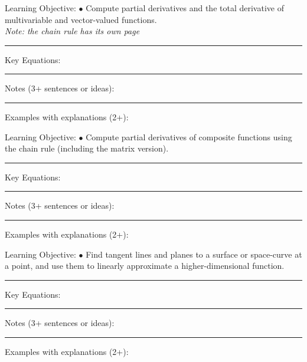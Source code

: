 \documentclass{article}
\theoremstyle{plain}
\theoremstyle{definition}
\theoremstyle{remark}
\begin{document}
\vskip-2pt
\noindent \large Learning Objective:
\normalsize
\vskip0.15in
$\bullet$ Compute partial derivatives and the total derivative of multivariable and vector-valued functions.\\
\emph{Note: the chain rule has its own page}
\vskip0.15in
\hrule
\vspace{0.1in}
\large \noindent Key Equations:
\normalsize

\vspace{1in}
\hrule
\vspace{0.1in}
\large \noindent Notes (3+ sentences or ideas):
\normalsize
\vspace{1.75in}
\hrule
\vspace{0.1in}

\large \noindent Examples with explanations (2+):

\newpage

\noindent \large Learning Objective:
\normalsize
\vskip0.15in
$\bullet$ Compute partial derivatives of composite functions using the chain rule (including the matrix version).
\vskip0.15in
\hrule
\vspace{0.1in}
\large \noindent Key Equations:
\normalsize

\vspace{1in}
\hrule
\vspace{0.1in}
\large \noindent Notes (3+ sentences or ideas):
\normalsize
\vspace{1.75in}
\hrule
\vspace{0.1in}

\large \noindent Examples with explanations (2+):

\newpage


\noindent \large Learning Objective:
\normalsize
\vskip0.15in
$\bullet$ Find tangent lines and planes to a surface or space-curve at a point, and use them to linearly approximate a higher-dimensional function.
\vskip0.15in
\hrule
\vspace{0.1in}
\large \noindent Key Equations:
\normalsize

\vspace{1in}
\hrule
\vspace{0.1in}
\large \noindent Notes (3+ sentences or ideas):
\normalsize
\vspace{1.75in}
\hrule
\vspace{0.1in}

\large \noindent Examples with explanations (2+):
\end{document}
